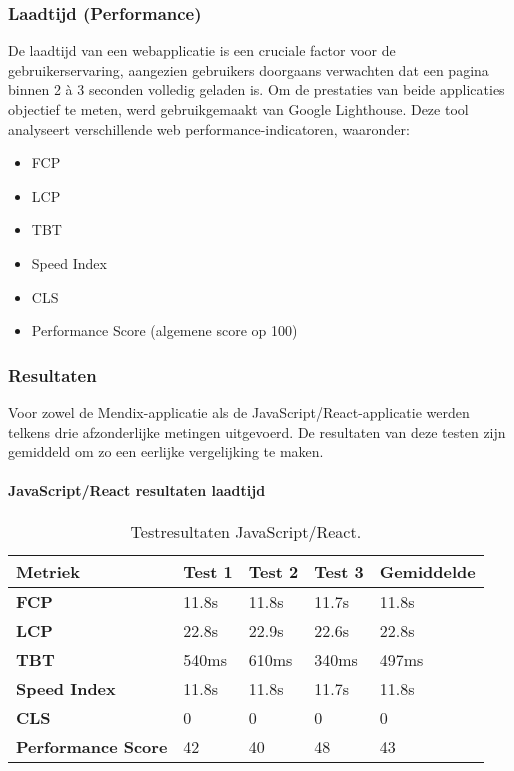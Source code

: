 \subsubsection{Laadtijd (Performance)}
De laadtijd van een webapplicatie is een cruciale factor voor de gebruikerservaring, aangezien gebruikers doorgaans verwachten dat een pagina binnen 2 à 3 seconden volledig geladen is. Om de prestaties van beide applicaties objectief te meten, werd gebruikgemaakt van Google Lighthouse. Deze tool analyseert verschillende web performance-indicatoren, waaronder:
\begin{itemize}
    \item \gls{FCP}
    \item \gls{LCP}
    \item \gls{TBT}
    \item Speed Index
    \item \gls{CLS}
    \item Performance Score (algemene score op 100)
\end{itemize}

\subsubsection{Resultaten}

Voor zowel de Mendix-applicatie als de JavaScript/React-applicatie werden telkens drie afzonderlijke metingen uitgevoerd. De resultaten van deze testen zijn gemiddeld om zo een eerlijke vergelijking te maken.
\newpage
\paragraph{JavaScript/React resultaten laadtijd}

\begin{table}[h]
    \centering
    \begin{tabular}{ |p{3cm}|p{2.75cm}|p{2.75cm}|p{2.75cm}|p{2.75cm}|}
        \hline
        \textbf{Metriek} & \textbf{Test 1} & \textbf{Test 2}  & \textbf{Test 3} & \textbf{Gemiddelde}\\
        \hline
        \textbf{\gls{FCP}}  & 11.8s & 11.8s & 11.7s & 11.8s \\
        \hline
        \textbf{\gls{LCP}} & 22.8s & 22.9s & 22.6s & 22.8s\\
        \hline
        \textbf{\gls{TBT}}  & 540ms & 610ms & 340ms & 497ms \\
        \hline
        \textbf{Speed Index}  & 11.8s & 11.8s & 11.7s & 11.8s \\
        \hline
        \textbf{\gls{CLS}}  & 0 & 0  & 0 & 0 \\
        \hline
        \textbf{Performance Score}  & 42 & 40  & 48 & 43 \\
        \hline
    \end{tabular}
    \caption[\centering Testresultaten laadtijd JavaScript/React]{\label{tab:Testresultaten JavaScript/React}Testresultaten JavaScript/React.}
\end{table}

